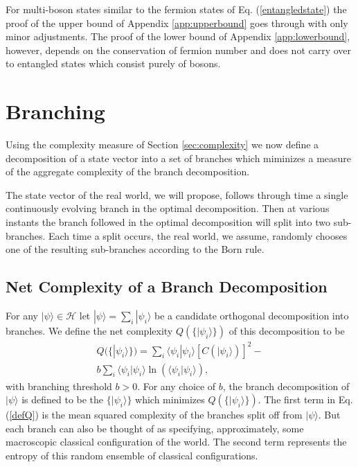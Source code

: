 \documentclass[12pt,amsmath,amssymb,onecolumn]{revtex4-2}
\begin{document}
For multi-boson states similar to
the fermion states of Eq. (\ref{entangledstate}) the
proof of the upper bound of
Appendix \ref{app:upperbound} goes through with only minor
adjustments. The proof of the
lower bound of Appendix \ref{app:lowerbound}, however,
depends on the conservation of fermion number and does not
carry over to entangled states which
consist purely of bosons.



\section{\label{sec:branching}Branching}

Using the complexity measure of Section \ref{sec:complexity} we now define a
decomposition of a state vector into a set of branches
which miminizes a measure of the aggregate complexity of
the branch decomposition.

The state vector of the real world, we will propose, follows through time
a single continuously evolving branch in the optimal decomposition.
Then at various instants the branch followed in the optimal decomposition
will split into two sub-branches. Each time a split occurs, the real world,
we assume,
randomly chooses one of the resulting sub-branches according to
the Born rule.

\subsection{\label{subsec:branchcomplexity} Net Complexity of a Branch Decomposition}


For any $|\psi \rangle  \in \mathcal{H}$ let 
 $ |\psi \rangle  = \sum_i |\psi_i \rangle $
be a candidate orthogonal decomposition into branches.
We define the net complexity $Q( \{|\psi_i \rangle \})$ of this decomposition to be
\begin{multline}\label{defQ} 
Q( \{|\psi_i \rangle \})  =  \sum_i \langle \psi_i | \psi_i \rangle  [C( |\psi_i \rangle )]^2 - \\
 b \sum_i \langle \psi_i | \psi_i \rangle  \ln( \langle \psi_i |\psi_i \rangle ),
\end{multline} 
with branching threshold $b > 0$. For any choice of $b$, the branch
decomposition of $|\psi \rangle $ is defined to be the $\{|\psi_i \rangle  \}$ which minimizes
$Q(\{|\psi_i \rangle  \})$. The first term in Eq. (\ref{defQ}) is the mean squared complexity
of the branches split off from $|\psi \rangle $. But each branch can also be thought
of as specifying, approximately, some macroscopic classical configuration of the
world. The second term represents the entropy of this random ensemble
of classical configurations.
\end{document}
